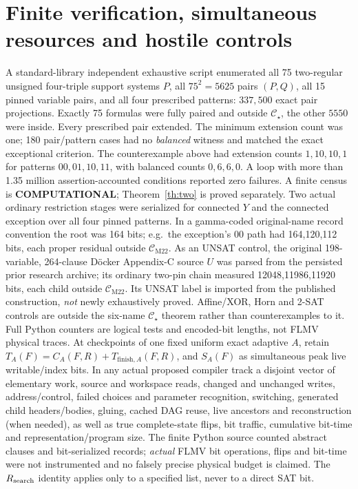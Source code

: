 \documentclass[11pt]{article}
\newcommand{\CM}{\mathcal C_{\mathrm{M22}}}
\newcommand{\CS}{\mathcal C_{\star}}
\begin{document}
\section{Finite verification, simultaneous resources and hostile controls}
A standard-library independent exhaustive script enumerated all 75 two-regular unsigned four-triple support systems \(P\), all \(75^2=5625\) pairs \((P,Q)\), all 15 pinned variable pairs, and all four prescribed patterns: \(337{,}500\) exact pair projections. Exactly 75 formulas were fully paired and outside \(\CS\), the other \(5550\) were inside. Every prescribed pair extended. The minimum extension count was one; 180 pair/pattern cases had no \emph{balanced} witness and matched the exact exceptional criterion. The counterexample above had extension counts \(1,10,10,1\) for patterns \(00,01,10,11\), with balanced counts \(0,6,6,0\). A loop with more than 1.35 million assertion-accounted conditions reported zero failures. A finite census is \textbf{COMPUTATIONAL}; Theorem~\ref{th:two} is proved separately.
Two actual ordinary restriction stages were serialized for connected \(Y\) and the connected exception over all four pinned patterns. In a gamma-coded original-name record convention the root was 164 bits; e.g.\ the exception's \(00\) path had 164,120,112 bits, each proper residual outside \(\CM\). As an UNSAT control, the original 198-variable, 264-clause D\"ocker Appendix-C source \(U\) was parsed from the persisted prior research archive; its ordinary two-pin chain measured 12048,11986,11920 bits, each child outside \(\CM\). Its UNSAT label is imported from the published construction, \emph{not} newly exhaustively proved. Affine/XOR, Horn and 2-SAT controls are outside the six-name \(\CS\) theorem rather than counterexamples to it. Full Python counters are logical tests and encoded-bit lengths, not FLMV physical traces.
At checkpoints of one fixed uniform exact adaptive \(A\), retain \(T_A(F)=C_A(F,R)+T_{\mathrm{finish},A}(F,R)\), and \(S_A(F)\) as simultaneous peak live writable/index bits. In any actual proposed compiler track a disjoint vector of elementary work, source and workspace reads, changed and unchanged writes, address/control, failed choices and parameter recognition, switching, generated child headers/bodies, gluing, cached DAG reuse, live ancestors and reconstruction (when needed), as well as true complete-state flips, bit traffic, cumulative bit-time and representation/program size. The finite Python source counted abstract clauses and bit-serialized records; \emph{actual} FLMV bit operations, flips and bit-time were not instrumented and no falsely precise physical budget is claimed. The \(R_{\rm search}\) identity applies only to a specified list, never to a direct SAT bit.
\end{document}
